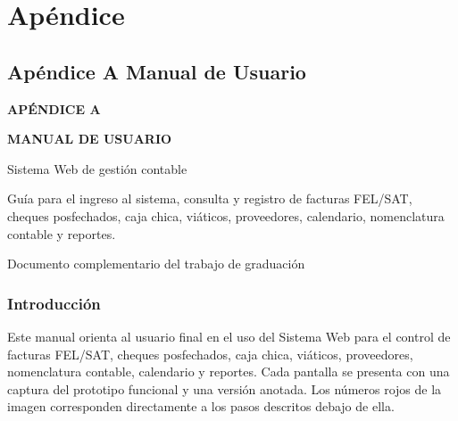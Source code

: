
\newpage
{}
\section*{Apéndice}\label{Apendice}

\appendix
\setcounter{section}{1}
\renewcommand{\thesection}{\Alph{section}}
\renewcommand{\thesubsection}{\thesection.\arabic{subsection}}
\renewcommand{\thesubsubsection}{\thesection.\arabic{subsubsection}}
\renewcommand{\thefigure}{\thesection\arabic{figure}}
\renewcommand{\thetable}{\thesection\arabic{table}}
\setcounter{figure}{0}
\setcounter{table}{0}
\setcounter{subsubsection}{0}
\captionsetup{list=false}
\pagestyle{cuerpo}

\setcounter{subsection}{0}
{}
\subsection*{Apéndice A Manual de Usuario}\label{ap:Manual-de-Usuario}
\begin{center}
\vspace*{2cm}
{\Large\textbf{APÉNDICE A}}\par
\vspace{1.5cm}
{\Large\textbf{MANUAL DE USUARIO}}\par
\vspace{0.8cm}
{\large Sistema Web de gestión contable}\par
\vspace{2cm}
\begin{minipage}{0.82\textwidth}
\centering
Guía para el ingreso al sistema, consulta y registro de facturas FEL/SAT, cheques posfechados, caja chica, viáticos, proveedores, calendario, nomenclatura contable y reportes.
\end{minipage}
\vfill
Documento complementario del trabajo de graduación\par
\end{center}


\setlength{\parindent}{1.27cm}
\setlength{\parskip}{0pt}

\subsubsection{Introducción}
Este manual orienta al usuario final en el uso del Sistema Web para el control de facturas FEL/SAT, cheques posfechados, caja chica, viáticos, proveedores, nomenclatura contable, calendario y reportes. Cada pantalla se presenta con una captura del prototipo funcional y una versión anotada. Los números rojos de la imagen corresponden directamente a los pasos descritos debajo de ella.

